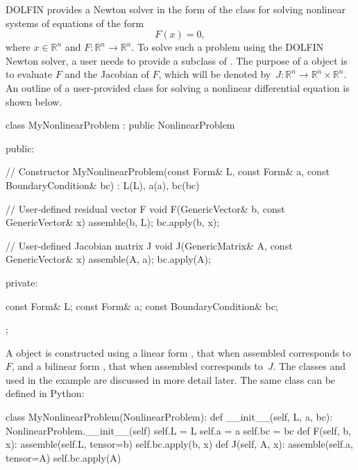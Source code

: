 DOLFIN provides a Newton solver in the form of the class
 for solving nonlinear systems of equations of the
form
\begin{equation}
  F(x) = 0,
\end{equation}
where $x \in \mathbb{R}^{n}$ and $F: \mathbb{R}^{n} \rightarrow
\mathbb{R}^{n}$. To solve such a problem using the DOLFIN Newton
solver, a user needs to provide a subclass of .
The purpose of a  object is to evaluate $F$ and
the Jacobian of $F$, which will be denoted by~$J: \mathbb{R}^{n}
\rightarrow \mathbb{R}^{n} \times \mathbb{R}^{n}$. An outline of a
user-provided  class for solving a nonlinear
differential equation is shown below.
\begin{c++}
class MyNonlinearProblem : public NonlinearProblem
{
public:

  // Constructor
  MyNonlinearProblem(const Form& L, const Form& a,
                     const BoundaryCondition& bc) : L(L), a(a), bc(bc) {}

  // User-defined residual vector F
  void F(GenericVector& b, const GenericVector& x)
  {
    assemble(b, L);
    bc.apply(b, x);
  }

  // User-defined Jacobian matrix J
  void J(GenericMatrix& A, const GenericVector& x)
  {
    assemble(A, a);
    bc.apply(A);
  }

private:

  const Form& L;
  const Form& a;
  const BoundaryCondition& bc;

};
\end{c++}
A  object is constructed using a linear form
, that when assembled corresponds to $F$, and a bilinear form
, that when assembled corresponds to~$J$. The classes 
and  used in the example are discussed in more
detail later.  The same  class can be defined
in Python:
\begin{python}
class MyNonlinearProblem(NonlinearProblem):
    def __init__(self, L, a, bc):
        NonlinearProblem.__init__(self)
        self.L = L
        self.a = a
        self.bc = bc
    def F(self, b, x):
        assemble(self.L, tensor=b)
        self.bc.apply(b, x)
    def J(self, A, x):
        assemble(self.a, tensor=A)
        self.bc.apply(A)
\end{python}

